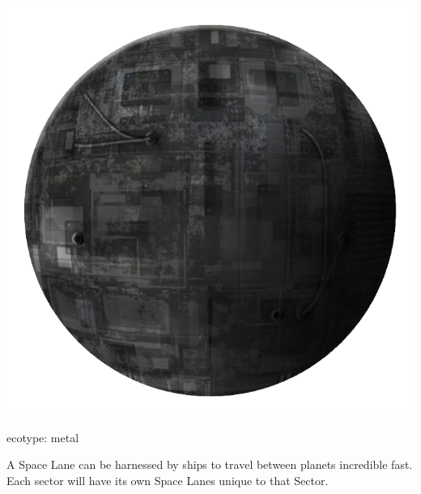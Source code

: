 \begin{marginfigure}
	\includegraphics{res/planets/metal-planet.png}
	\caption{ecotype: metal}
	\label{fig:model:metalPlanet}
\end{marginfigure}


A Space Lane can be harnessed by ships to travel between planets incredible fast.
Each sector will have its own Space Lanes unique to that Sector.





 


% 